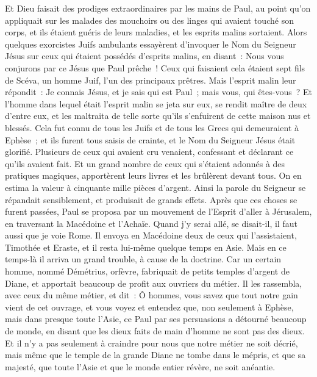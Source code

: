 \begin{multicols}{2}
Et Dieu faisait des prodiges extraordinaires par les mains de Paul,
au point qu'on appliquait sur les malades des mouchoirs ou des linges qui avaient touché son corps, et ils étaient guéris de leurs maladies, et les esprits malins sortaient.
Alors quelques exorcistes Juifs ambulants essayèrent d'invoquer le Nom du Seigneur Jésus sur ceux qui étaient possédés d'esprits malins, en disant~: Nous vous conjurons par ce Jésus que Paul prêche~!
Ceux qui faisaient cela étaient sept fils de Scéva, un homme Juif, l'un des principaux prêtres.
Mais l'esprit malin leur répondit~: Je connais Jésus, et je sais qui est Paul~; mais vous, qui êtes-vous~?
Et l'homme dans lequel était l'esprit malin se jeta sur eux, se rendit maître de deux d'entre eux, et les maltraita de telle sorte qu'ils s'enfuirent de cette maison nus et blessés.
Cela fut connu de tous les Juifs et de tous les Grecs qui demeuraient à Ephèse~; et ils furent tous saisis de crainte, et le Nom du Seigneur Jésus était glorifié.
Plusieurs de ceux qui avaient cru venaient, confessant et déclarant ce qu'ils avaient fait.
Et un grand nombre de ceux qui s'étaient adonnés à des pratiques magiques, apportèrent leurs livres et les brûlèrent devant tous. On en estima la valeur à cinquante mille pièces d'argent.
Ainsi la parole du Seigneur se répandait sensiblement, et produisait de grands effets.
Après que ces choses se furent passées, Paul se proposa par un mouvement de l'Esprit d'aller à Jérusalem, en traversant la Macédoine et l'Achaïe. Quand j'y serai allé, se disait-il, il faut aussi que je voie Rome.
Il envoya en Macédoine deux de ceux qui l'assistaient, Timothée et Eraste, et il resta lui-même quelque temps en Asie.
Mais en ce temps-là il arriva un grand trouble, à cause de la doctrine.
Car un certain homme, nommé Démétrius, orfèvre, fabriquait de petits temples d'argent de Diane, et apportait beaucoup de profit aux ouvriers du métier.
Il les rassembla, avec ceux du même métier, et dit~: Ô hommes, vous savez que tout notre gain vient de cet ouvrage,
et vous voyez et entendez que, non seulement à Ephèse, mais dans presque toute l'Asie, ce Paul par ses persuasions a détourné beaucoup de monde, en disant que les dieux faits de main d'homme ne sont pas des dieux.
Et il n'y a pas seulement à craindre pour nous que notre métier ne soit décrié, mais même que le temple de la grande Diane ne tombe dans le mépris, et que sa majesté, que toute l'Asie et que le monde entier révère, ne soit anéantie.

\end{multicols}
